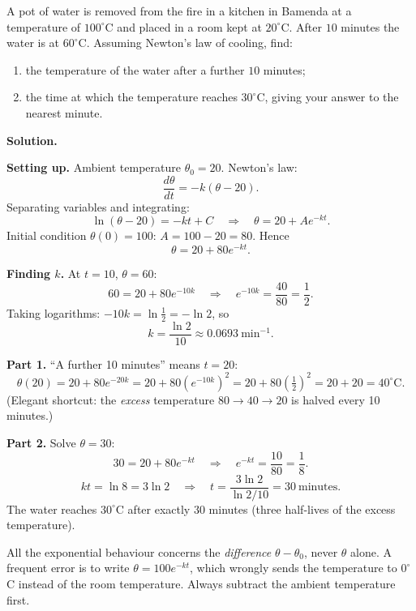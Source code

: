 \documentclass[11pt]{article}
\begin{document}
\begin{exoresolu}
A pot of water is removed from the fire in a kitchen in Bamenda at a temperature of $100^\circ$C and placed in a room kept at $20^\circ$C. After $10$ minutes the water is at $60^\circ$C. Assuming Newton's law of cooling, find:
\begin{enumerate}
\item the temperature of the water after a further $10$ minutes;
\item the time at which the temperature reaches $30^\circ$C, giving your answer to the nearest minute.
\end{enumerate}
\tcblower
\textbf{Solution.}

\textbf{Setting up.} Ambient temperature $\theta_0 = 20$. Newton's law:
\[ \frac{d\theta}{dt} = -k(\theta - 20). \]
Separating variables and integrating:
\[ \ln(\theta - 20) = -kt + C \quad\Longrightarrow\quad \theta = 20 + Ae^{-kt}. \]
Initial condition $\theta(0) = 100$: $A = 100 - 20 = 80$. Hence
\[ \theta = 20 + 80e^{-kt}. \]

\textbf{Finding $k$.} At $t = 10$, $\theta = 60$:
\[ 60 = 20 + 80e^{-10k} \quad\Longrightarrow\quad e^{-10k} = \frac{40}{80} = \frac{1}{2}. \]
Taking logarithms: $-10k = \ln\tfrac12 = -\ln 2$, so
\[ k = \frac{\ln 2}{10} \approx 0.0693\ \text{min}^{-1}. \]

\textbf{Part 1.} ``A further 10 minutes'' means $t = 20$:
\[ \theta(20) = 20 + 80e^{-20k} = 20 + 80\left(e^{-10k}\right)^2 = 20 + 80\left(\tfrac12\right)^2 = 20 + 20 = \boxed{40^\circ\text{C}.} \]
(Elegant shortcut: the \emph{excess} temperature $80 \to 40 \to 20$ is halved every 10 minutes.)

\textbf{Part 2.} Solve $\theta = 30$:
\[ 30 = 20 + 80e^{-kt} \quad\Longrightarrow\quad e^{-kt} = \frac{10}{80} = \frac18. \]
\[ kt = \ln 8 = 3\ln 2 \quad\Longrightarrow\quad t = \frac{3\ln 2}{\ln 2 / 10} = 30\ \text{minutes}. \]
The water reaches $30^\circ$C after exactly $\boxed{30}$ minutes (three half-lives of the excess temperature).
\end{exoresolu}

\begin{attention}
All the exponential behaviour concerns the \emph{difference} $\theta - \theta_0$, never $\theta$ alone. A frequent error is to write $\theta = 100e^{-kt}$, which wrongly sends the temperature to $0^\circ$C instead of the room temperature. Always subtract the ambient temperature first.
\end{attention}
\end{document}
